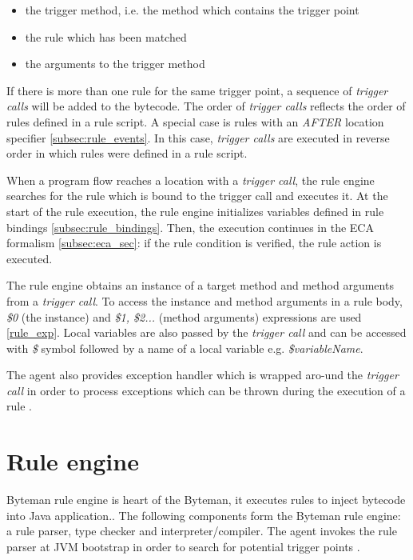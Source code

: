 \documentclass[12pt,oneside]{fithesis2}
\begin{document}
\begin{itemize}
	\item	the trigger method, i.e. the method which contains the trigger point
	\item	the rule which has been matched
	\item	the arguments to the trigger method
\end{itemize}

If there is more than one rule for the same trigger point, a sequence of \textit{trigger calls} will be added to the bytecode. The order of \textit{trigger calls} reflects the order of rules defined in a rule script. A special case is rules with an \textit{AFTER} location specifier \ref{subsec:rule_events}. In this case, \textit{trigger calls} are executed in reverse order in which rules were defined in a rule script.

When a program flow reaches a location with a \textit{trigger call}, the rule engine searches for the rule which is bound to the trigger call and executes it. At the start of the rule execution, the rule engine initializes variables defined in rule bindings \ref{subsec:rule_bindings}. Then, the execution continues in the ECA formalism \ref{subsec:eca_sec}: if the rule condition is verified, the rule action is executed.

The rule engine obtains an instance of a target method and method arguments from a \textit{trigger call}. To access the instance and method arguments in a rule body, \textit{\$0} (the instance) and \textit{\$1, \$2...} (method arguments) expressions are used \ref{rule_exp}. Local variables are also passed by the \textit{trigger call} and can be accessed with \textit{\$} symbol followed by a name of a local variable e.g. \textit{\$variableName}.

The agent also provides exception handler which is wrapped aro-und the \textit{trigger call} in order to process exceptions which can be thrown during the execution of a rule \cite[Agent Transformation]{byteman_doc}.

\section{Rule engine}
\label{sec:rule_engine}
Byteman rule engine is heart of the Byteman, it executes rules to inject bytecode into Java application.. The following components form the Byteman rule engine: a rule parser, type checker and interpreter/compiler. The agent invokes the rule parser at JVM bootstrap in order to search for potential trigger points \cite[ECA Rule Engine]{byteman_doc}.
\end{document}
